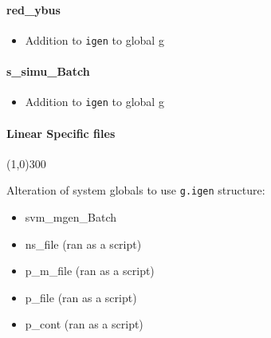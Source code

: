 \documentclass[12pt]{article}
\begin{document}
\paragraph{red\_ybus}
	\begin{itemize}
		\item Addition to \verb|igen| to global g
	\end{itemize}

\paragraph{s\_simu\_Batch}
	\begin{itemize}
		\item Addition to \verb|igen| to global g
	\end{itemize}
			
\paragraph{Linear Specific files}\line(1,0){300}

Alteration of system globals to use \verb|g.igen| structure:

	\begin{itemize}
		\item svm\_mgen\_Batch
		\item ns\_file (ran as a script)
		\item p\_m\_file (ran as a script)
		\item p\_file (ran as a script)
		\item p\_cont (ran as a script)
	\end{itemize}
	
	
\end{document}
